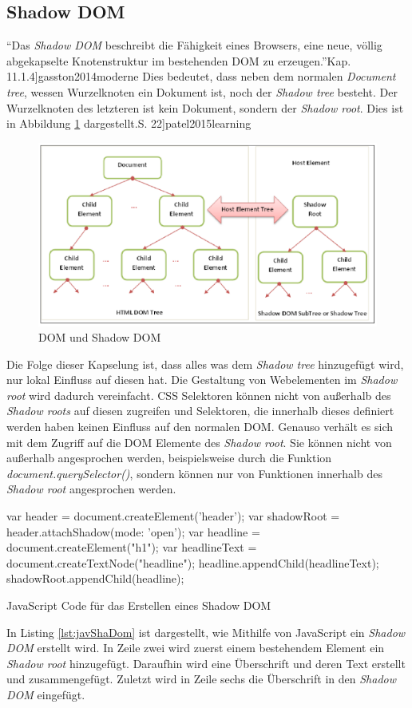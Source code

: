 \documentclass[12pt, paper=a4, bibtotoc, toc=listof, headsepline=true]{scrreprt}
\renewcommand{\smfootcite}[2][2]{\relax}
\begin{document}
			\subsection{Shadow DOM}
			\enquote{Das \emph{Shadow \ac{DOM}} beschreibt die Fähigkeit eines Browsers, eine neue, völlig abgekapselte Knotenstruktur im bestehenden \ac{DOM} zu erzeugen.}\smfootcite[ ][Kap. 11.1.4]{gasston2014moderne} Dies bedeutet, dass neben dem normalen \emph{Document tree}, wessen Wurzelknoten ein Dokument ist, noch der \emph{Shadow tree} besteht. Der Wurzelknoten des letzteren ist kein Dokument, sondern der \emph{Shadow root}. Dies ist in Abbildung \ref{img:shaDom} dargestellt.\smfootcite[ vgl.][S. 22]{patel2015learning} 
			\begin{figure}
				\centering
				\includegraphics[width=\textwidth,height=\textheight,keepaspectratio]{shaDom.png}
				\caption{DOM und Shadow \ac{DOM} }
				\label{img:shaDom}
			\end{figure}
			Die Folge dieser Kapselung ist, dass alles was dem \emph{Shadow tree} hinzugefügt wird, nur lokal Einfluss auf diesen hat. Die Gestaltung von Webelementen im \emph{Shadow root} wird dadurch vereinfacht.
			\ac{CSS} Selektoren können nicht von außerhalb des \emph{Shadow roots} auf diesen zugreifen und Selektoren, die innerhalb dieses definiert werden haben keinen Einfluss auf den normalen \ac{DOM}. Genauso verhält es sich mit dem Zugriff auf die \ac{DOM} Elemente des \emph{Shadow root}. Sie können nicht von außerhalb angesprochen werden, beispielsweise durch die Funktion \emph{document.querySelector()}, sondern können nur von Funktionen innerhalb des \emph{Shadow root} angesprochen werden.\smfootcite{Bidelman2016}
			\begin{listing}
				\begin{JavaScriptcode*}{}
var header = document.createElement('header');
var shadowRoot = header.attachShadow({mode: 'open'});
var headline = document.createElement("h1");
var headlineText = document.createTextNode("headline");
headline.appendChild(headlineText);
shadowRoot.appendChild(headline);
				\end{JavaScriptcode*}
				\caption{JavaScript Code für das Erstellen eines Shadow DOM}
				\label{lst:javShaDom}
			\end{listing}
			In Listing \ref{lst:javShaDom} ist dargestellt, wie Mithilfe von JavaScript ein \emph{Shadow \ac{DOM}} erstellt wird. In Zeile zwei wird zuerst einem bestehendem Element ein \emph{Shadow root} hinzugefügt. Daraufhin wird eine Überschrift und deren Text erstellt und zusammengefügt. Zuletzt wird in Zeile sechs die Überschrift in den \emph{Shadow \ac{DOM}} eingefügt.
\end{document}
